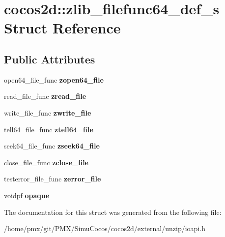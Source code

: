 \hypertarget{structcocos2d_1_1zlib__filefunc64__def__s}{}\section{cocos2d\+:\+:zlib\+\_\+filefunc64\+\_\+def\+\_\+s Struct Reference}
\label{structcocos2d_1_1zlib__filefunc64__def__s}
\subsection*{Public Attributes}
\begin{DoxyCompactItemize}
\item 
\mbox{\label{structcocos2d_1_1zlib__filefunc64__def__s_ac732d9bcfcde6e11e7f03a6be6701d69}} 
open64\+\_\+file\+\_\+func {\bfseries zopen64\+\_\+file}
\item 
\mbox{\label{structcocos2d_1_1zlib__filefunc64__def__s_a0f9d05149b8cd9d26bcf23bc5be6ba32}} 
read\+\_\+file\+\_\+func {\bfseries zread\+\_\+file}
\item 
\mbox{\label{structcocos2d_1_1zlib__filefunc64__def__s_a5a7deb41dca9791254b8f06ddc4035e9}} 
write\+\_\+file\+\_\+func {\bfseries zwrite\+\_\+file}
\item 
\mbox{\label{structcocos2d_1_1zlib__filefunc64__def__s_a2275e8ed1152f713aa942de190976239}} 
tell64\+\_\+file\+\_\+func {\bfseries ztell64\+\_\+file}
\item 
\mbox{\label{structcocos2d_1_1zlib__filefunc64__def__s_a516af18e831698fe4ab7fa81329d6cf2}} 
seek64\+\_\+file\+\_\+func {\bfseries zseek64\+\_\+file}
\item 
\mbox{\label{structcocos2d_1_1zlib__filefunc64__def__s_ad7e3d7236b828e05ff50a59f948e9df9}} 
close\+\_\+file\+\_\+func {\bfseries zclose\+\_\+file}
\item 
\mbox{\label{structcocos2d_1_1zlib__filefunc64__def__s_ab72a47e560b6321596e8d557504b608a}} 
testerror\+\_\+file\+\_\+func {\bfseries zerror\+\_\+file}
\item 
\mbox{\label{structcocos2d_1_1zlib__filefunc64__def__s_a65e10611ab91caa2f0af5b3765244ad3}} 
voidpf {\bfseries opaque}
\end{DoxyCompactItemize}


The documentation for this struct was generated from the following file\+:\begin{DoxyCompactItemize}
\item 
/home/pmx/git/\+P\+M\+X/\+Simu\+Cocos/cocos2d/external/unzip/ioapi.\+h\end{DoxyCompactItemize}
